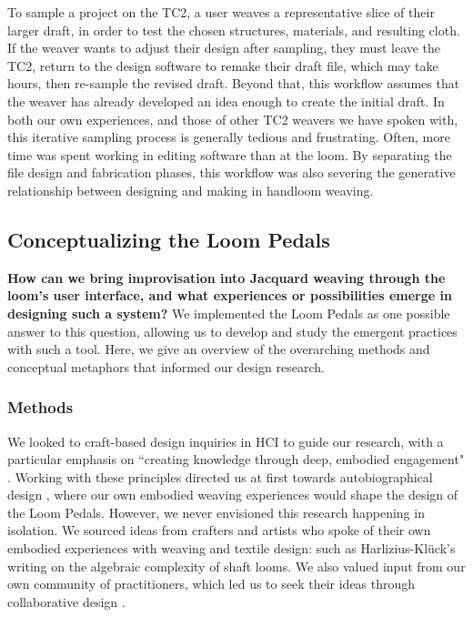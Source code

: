 To sample a project on the TC2, a user weaves a representative slice of their larger draft, in order to test the chosen structures, materials, and resulting cloth. If the weaver wants to adjust their design after sampling, they must leave the TC2, return to the design software to remake their draft file, which may take hours, then re-sample the revised draft. Beyond that, this workflow assumes that the weaver has already developed an idea enough to create the initial draft. In both our own experiences, and those of other TC2 weavers we have spoken with, this iterative sampling process is generally tedious and frustrating. Often, more time was spent working in editing software than at the loom. By separating the file design and fabrication phases, this workflow was also severing the generative relationship between designing and making in handloom weaving.

\subsection{Conceptualizing the Loom Pedals}

\textbf{How can we bring improvisation into Jacquard weaving through the loom’s user interface, and what experiences or possibilities emerge in designing such a system?} We implemented the Loom Pedals as one possible answer to this question, allowing us to develop and study the emergent practices with such a tool. Here, we give an overview of the overarching methods and conceptual metaphors that informed our design research. 

\subsubsection{Methods}

We looked to craft-based design inquiries in HCI to guide our research, with a particular emphasis on “creating knowledge through deep, embodied engagement" \cite{frankjaer_understanding_2018}. Working with these principles directed us at first towards autobiographical design \cite{neustaedter_autobiographical_2012, desjardins_revealing_2018}, where our own embodied weaving experiences would shape the design of the Loom Pedals. However, we never envisioned this research happening in isolation. We sourced ideas from crafters and artists who spoke of their own embodied experiences with weaving and textile design: such as Harlizius-Kl\"{u}ck’s writing on the algebraic complexity of shaft looms. We also valued input from our own community of practitioners, which led us to seek their ideas through collaborative design \cite{devendorf_craftspeople_2020, mironcika_snap-snap_2020, recupero_balancing_2021}.

